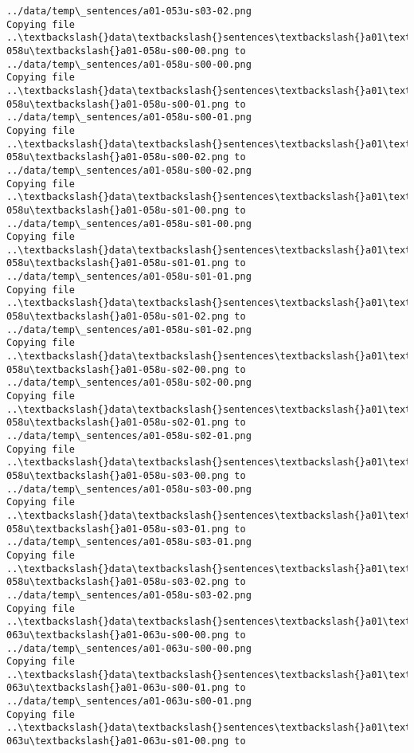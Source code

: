 \documentclass[11pt]{article}
\begin{document}
\begin{Verbatim}[commandchars=\\\{\}]
../data/temp\_sentences/a01-053u-s03-02.png
Copying file ..\textbackslash{}data\textbackslash{}sentences\textbackslash{}a01\textbackslash{}a01-058u\textbackslash{}a01-058u-s00-00.png to
../data/temp\_sentences/a01-058u-s00-00.png
Copying file ..\textbackslash{}data\textbackslash{}sentences\textbackslash{}a01\textbackslash{}a01-058u\textbackslash{}a01-058u-s00-01.png to
../data/temp\_sentences/a01-058u-s00-01.png
Copying file ..\textbackslash{}data\textbackslash{}sentences\textbackslash{}a01\textbackslash{}a01-058u\textbackslash{}a01-058u-s00-02.png to
../data/temp\_sentences/a01-058u-s00-02.png
Copying file ..\textbackslash{}data\textbackslash{}sentences\textbackslash{}a01\textbackslash{}a01-058u\textbackslash{}a01-058u-s01-00.png to
../data/temp\_sentences/a01-058u-s01-00.png
Copying file ..\textbackslash{}data\textbackslash{}sentences\textbackslash{}a01\textbackslash{}a01-058u\textbackslash{}a01-058u-s01-01.png to
../data/temp\_sentences/a01-058u-s01-01.png
Copying file ..\textbackslash{}data\textbackslash{}sentences\textbackslash{}a01\textbackslash{}a01-058u\textbackslash{}a01-058u-s01-02.png to
../data/temp\_sentences/a01-058u-s01-02.png
Copying file ..\textbackslash{}data\textbackslash{}sentences\textbackslash{}a01\textbackslash{}a01-058u\textbackslash{}a01-058u-s02-00.png to
../data/temp\_sentences/a01-058u-s02-00.png
Copying file ..\textbackslash{}data\textbackslash{}sentences\textbackslash{}a01\textbackslash{}a01-058u\textbackslash{}a01-058u-s02-01.png to
../data/temp\_sentences/a01-058u-s02-01.png
Copying file ..\textbackslash{}data\textbackslash{}sentences\textbackslash{}a01\textbackslash{}a01-058u\textbackslash{}a01-058u-s03-00.png to
../data/temp\_sentences/a01-058u-s03-00.png
Copying file ..\textbackslash{}data\textbackslash{}sentences\textbackslash{}a01\textbackslash{}a01-058u\textbackslash{}a01-058u-s03-01.png to
../data/temp\_sentences/a01-058u-s03-01.png
Copying file ..\textbackslash{}data\textbackslash{}sentences\textbackslash{}a01\textbackslash{}a01-058u\textbackslash{}a01-058u-s03-02.png to
../data/temp\_sentences/a01-058u-s03-02.png
Copying file ..\textbackslash{}data\textbackslash{}sentences\textbackslash{}a01\textbackslash{}a01-063u\textbackslash{}a01-063u-s00-00.png to
../data/temp\_sentences/a01-063u-s00-00.png
Copying file ..\textbackslash{}data\textbackslash{}sentences\textbackslash{}a01\textbackslash{}a01-063u\textbackslash{}a01-063u-s00-01.png to
../data/temp\_sentences/a01-063u-s00-01.png
Copying file ..\textbackslash{}data\textbackslash{}sentences\textbackslash{}a01\textbackslash{}a01-063u\textbackslash{}a01-063u-s01-00.png to

\end{Verbatim}
\end{document}
